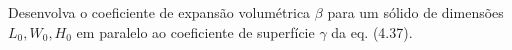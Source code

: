 Desenvolva o coeficiente de expansão volumétrica $\beta$ para um sólido de dimensões $L_0, W_0, H_0$ em paralelo ao coeficiente de superfície $\gamma$ da eq. (4.37).

